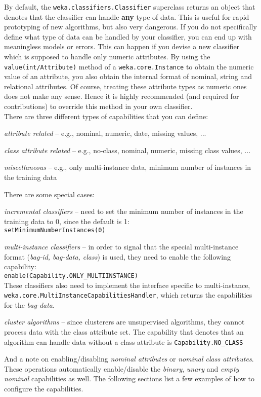 \newpage
{}
\label{classifier_capabilities}
By default, the \texttt{weka.classifiers.Classifier} superclass returns an
object that denotes that the classifier can handle \textbf{any} type of data.
This is useful for rapid prototyping of new algorithms, but also very
dangerous. If you do not specifically define what type of data can be handled by
your classifier, you can end up with meaningless models or errors. This can
happen if you devise a new classifier which is supposed to handle only numeric
attributes. By using the \texttt{value(int/Attribute)} method of a
\texttt{weka.core.Instance} to obtain the numeric value of an attribute, you
also obtain the internal format of nominal, string and relational attributes. Of
course, treating these attribute types as numeric ones does not make any sense.
Hence it is highly recommended (and required for contributions) to override this
method in your own classifier. \\

\noindent There are three different types of capabilities that you can define:
\begin{tight_enumerate}
  \item \textit{attribute related} -- e.g., nominal, numeric, date, missing
values, ...
  \item \textit{class attribute related} -- e.g., no-class, nominal, numeric,
missing class values, ...
  \item \textit{miscellaneous} -- e.g., only multi-instance data, minimum number
of instances in the training data
\end{tight_enumerate}
There are some special cases:
\begin{tight_itemize}
  \item \textit{incremental classifiers} -- need to set the minimum number of
instances in the training data to 0, since the default is 1: \\
  \texttt{setMinimumNumberInstances(0)}
  
  \item \textit{multi-instance classifiers} -- in order to signal that the
special multi-instance format (\textit{bag-id, bag-data, class}) is used, they
need to enable the following capability: \\
  \texttt{enable(Capability.ONLY\_MULTIINSTANCE)} \\
  These classifiers also need to implement the interface specific to
multi-instance, \texttt{weka.core.MultiInstanceCapabilitiesHandler}, which
returns the capabilities for the \textit{bag-data}.

  \item \textit{cluster algorithms} -- since clusterers are unsupervised
algorithms, they cannot process data with the class attribute set. The
capability that denotes that an algorithm can handle data without a class
attribute is \texttt{Capability.NO\_CLASS}
\end{tight_itemize}
And a note on enabling/disabling \textit{nominal attributes} or \textit{nominal
class attributes}. These operations automatically enable/disable the
\textit{binary}, \textit{unary} and \textit{empty nominal} capabilities as well.
The following sections list a few examples of how to configure the capabilities.

